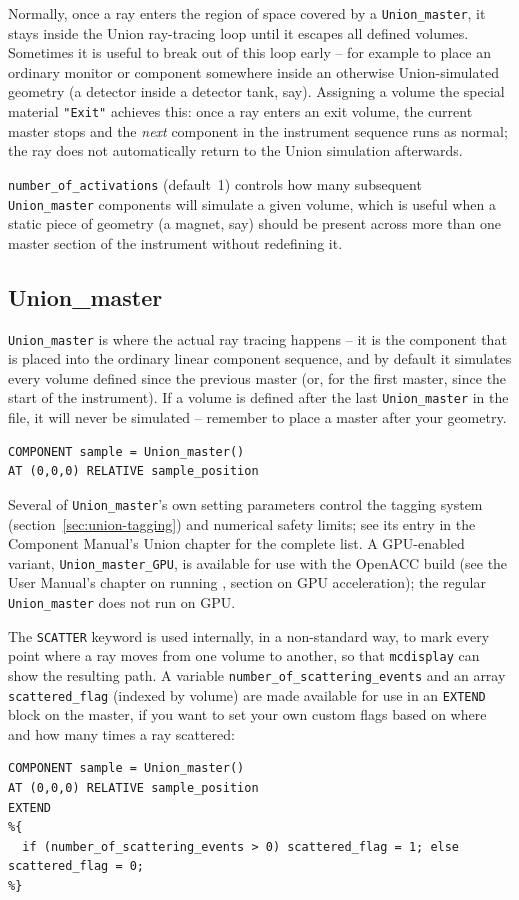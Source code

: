 Normally, once a ray enters the region of space covered by a
\texttt{Union\_master}, it stays inside the Union ray-tracing loop until it
escapes all defined volumes. Sometimes it is useful to break out of this
loop early -- for example to place an ordinary \MCS monitor or component
somewhere inside an otherwise Union-simulated geometry (a detector inside a
detector tank, say). Assigning a volume the special material
\texttt{"Exit"} achieves this: once a ray enters an exit volume, the current
master stops and the \emph{next} \MCS component in the instrument sequence
runs as normal; the ray does not automatically return to the Union
simulation afterwards.

\texttt{number\_of\_activations} (default~1) controls how many subsequent
\texttt{Union\_master} components will simulate a given volume, which is
useful when a static piece of geometry (a magnet, say) should be present
across more than one master section of the instrument without redefining
it.

\subsection{Union\_master}
\label{sec:union-master}

\texttt{Union\_master} is where the actual ray tracing happens -- it is the
component that is placed into the ordinary linear \MCS component sequence,
and by default it simulates every volume defined since the previous master
(or, for the first master, since the start of the instrument). If a volume is
defined after the last \texttt{Union\_master} in the file, it will never be
simulated -- remember to place a master after your geometry.
\begin{lstlisting}
COMPONENT sample = Union_master()
AT (0,0,0) RELATIVE sample_position
\end{lstlisting}
Several of \texttt{Union\_master}'s own setting parameters control the
tagging system (section~\ref{sec:union-tagging}) and numerical safety
limits; see its entry in the Component Manual's Union chapter for the
complete list. A GPU-enabled variant, \texttt{Union\_master\_GPU}, is
available for use with the OpenACC build (see the User Manual's chapter
on running \MCS, section on GPU acceleration); the regular
\texttt{Union\_master} does not run on GPU.

The \texttt{SCATTER} keyword is used internally, in a non-standard way, to
mark every point where a ray moves from one volume to another, so that
\texttt{mcdisplay} can show the resulting path. A variable
\texttt{number\_of\_scattering\_events} and an array \texttt{scattered\_flag}
(indexed by volume) are made available for use in an \texttt{EXTEND} block
on the master, if you want to set your own custom flags based on where and
how many times a ray scattered:
\begin{lstlisting}
COMPONENT sample = Union_master()
AT (0,0,0) RELATIVE sample_position
EXTEND
%{
  if (number_of_scattering_events > 0) scattered_flag = 1; else scattered_flag = 0;
%}
\end{lstlisting}

